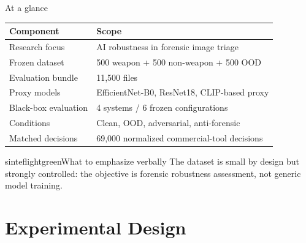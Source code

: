 \documentclass{beamer}
\begin{document}
\begin{frame}{At a glance}
\begin{table}
\centering
\small
\begin{tabular}{@{}ll@{}}
\toprule
\textbf{Component} & \textbf{Scope} \\
\midrule
Research focus & AI robustness in forensic image triage \\
Frozen dataset & 500 weapon + 500 non-weapon + 500 OOD \\
Evaluation bundle & 11,500 files \\
Proxy models & EfficientNet-B0, ResNet18, CLIP-based proxy \\
Black-box evaluation & 4 systems / 6 frozen configurations \\
Conditions & Clean, OOD, adversarial, anti-forensic \\
Matched decisions & 69,000 normalized commercial-tool decisions \\
\bottomrule
\end{tabular}
\end{table}

\begin{colorblock}[black]{sinteflightgreen}{What to emphasize verbally}
The dataset is small by design but strongly controlled: the objective is forensic robustness assessment, not generic model training.
\end{colorblock}
\end{frame}

\section{Experimental Design}
\end{document}
